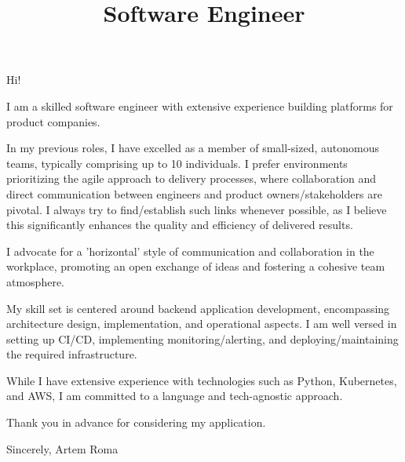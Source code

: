 \documentclass[11pt,a4paper,sans]{moderncv}
\title{Software Engineer}
\begin{document}
Hi!

I am a skilled software engineer with extensive experience building platforms for product companies.

In my previous roles, I have excelled as a member of small-sized, autonomous teams, typically comprising up to 10 individuals. 
I prefer environments prioritizing the agile approach to delivery processes, 
where collaboration and direct communication between engineers and product owners/stakeholders are pivotal. 
I always try to find/establish such links whenever possible, as I believe this significantly enhances the quality and efficiency of delivered results.

I advocate for a 'horizontal' style of communication and collaboration in the workplace, promoting an open exchange of ideas and fostering a cohesive team atmosphere.

My skill set is centered around backend application development, encompassing architecture design, implementation, and operational aspects. I am well versed in setting up CI/CD, implementing monitoring/alerting, and deploying/maintaining the required infrastructure.

While I have extensive experience with technologies such as Python, Kubernetes, and AWS, I am committed to a language and tech-agnostic approach.

Thank you in advance for considering my application.

Sincerely, Artem Roma
\end{document}

